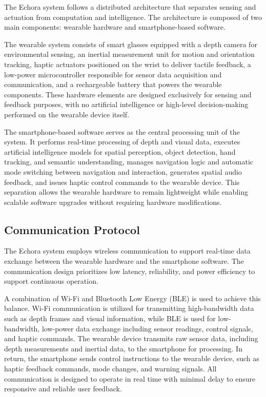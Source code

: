 The Echora system follows a distributed architecture that separates sensing and actuation from computation and intelligence. The architecture is composed of two main components: wearable hardware and smartphone-based software.

The wearable system consists of smart glasses equipped with a depth camera for environmental sensing, an inertial measurement unit for motion and orientation tracking, haptic actuators positioned on the wrist to deliver tactile feedback, a low-power microcontroller responsible for sensor data acquisition and communication, and a rechargeable battery that powers the wearable components. These hardware elements are designed exclusively for sensing and feedback purposes, with no artificial intelligence or high-level decision-making performed on the wearable device itself.

The smartphone-based software serves as the central processing unit of the system. It performs real-time processing of depth and visual data, executes artificial intelligence models for spatial perception, object detection, hand tracking, and semantic understanding, manages navigation logic and automatic mode switching between navigation and interaction, generates spatial audio feedback, and issues haptic control commands to the wearable device. This separation allows the wearable hardware to remain lightweight while enabling scalable software upgrades without requiring hardware modifications.

\subsection{Communication Protocol}
\label{subsubsec:communication_protocol}

The Echora system employs wireless communication to support real-time data exchange between the wearable hardware and the smartphone software. The communication design prioritizes low latency, reliability, and power efficiency to support continuous operation.

A combination of Wi-Fi and Bluetooth Low Energy (BLE) is used to achieve this balance. Wi-Fi communication is utilized for transmitting high-bandwidth data such as depth frames and visual information, while BLE is used for low-bandwidth, low-power data exchange including sensor readings, control signals, and haptic commands. The wearable device transmits raw sensor data, including depth measurements and inertial data, to the smartphone for processing. In return, the smartphone sends control instructions to the wearable device, such as haptic feedback commands, mode changes, and warning signals. All communication is designed to operate in real time with minimal delay to ensure responsive and reliable user feedback.

